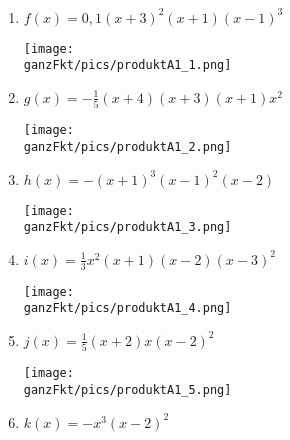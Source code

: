 \begin{Answer}[ref=ganzProduktA1]\\
	\begin{minipage}{\textwidth}
		\begin{minipage}{0.49\textwidth}
			\begin{enumerate}[label=\alph*)]
				\item \(f(x)=0,1\left(x+3\right)^2\left(x+1\right)\left(x-1\right)^3\)\\\begin{minipage}[t]{0.95\textwidth}
					\texttt{[image: \\ganzFkt/pics/produktA1\_1.png]}
				\end{minipage}
				\item \(g(x)=-\frac{1}{5}\left(x+4\right) \left(x+3\right) \left(x+1\right) x^2 \)\\\begin{minipage}[t]{0.95\textwidth}
					\texttt{[image: \\ganzFkt/pics/produktA1\_2.png]}
				\end{minipage}
				\item \(h(x)=-\left(x+1\right)^3 \left(x-1\right)^2 \left(x-2\right)\)\\\begin{minipage}[t]{0.95\textwidth}
					\texttt{[image: \\ganzFkt/pics/produktA1\_3.png]}
				\end{minipage}
				\item \(i(x)=\frac{1}{3}x^2\left(x+1\right) \left( x-2\right) \left( x-3\right) ^2\)\\\begin{minipage}[t]{0.95\textwidth}
					\texttt{[image: \\ganzFkt/pics/produktA1\_4.png]}
				\end{minipage}
			\end{enumerate}
		\end{minipage}
		\begin{minipage}{0.49\textwidth}
			\begin{enumerate}[label=\alph*)]
				\setcounter{enumi}{4}
				\item \(j(x)=\frac{1}{5}\left( x+2\right) x\left( x-2\right) ^2\)\\\begin{minipage}[t]{0.95\textwidth}
					\texttt{[image: \\ganzFkt/pics/produktA1\_5.png]}
				\end{minipage}
				\item \(k(x)=-x^3\left( x-2\right) ^2\)\\\begin{minipage}[t]{0.95\textwidth}

\end{minipage}
\end{enumerate}
\end{minipage}
\end{minipage}
\end{Answer}
